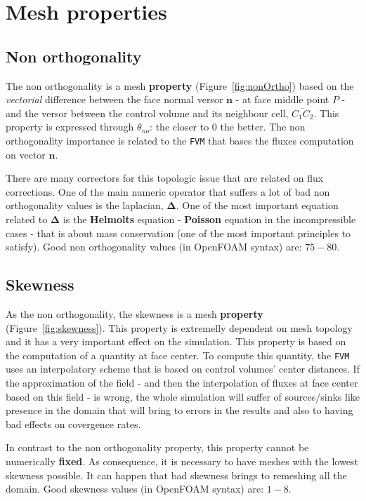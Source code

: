 \section{Mesh properties} \label{app:appMesh}

    \renewcommand{\thepage}{\arabic{page}}
    \setcounter{page}{\thelastPage}

\subsection{Non orthogonality} \label{sec:nonOrtho}
    The non orthogonality is a mesh \textbf{property} (Figure~\ref{fig:nonOrtho}) based on the \textit{vectorial} difference between the face normal versor $\boldsymbol{n}$ - at face middle point $P$ - and the versor between the control volume and its neighbour cell, $\overline{C_1 C_2}$. This property is expressed through $\theta_{no}$: the closer to $0$ the better. The non orthogonality importance is related to the \verb|FVM| that bases the fluxes computation on vector $\boldsymbol{n}$. 



There are many correctors for this topologic issue that are related on flux corrections. One of the main numeric operator that suffers a lot of bad non orthogonality values is the laplacian, $\boldsymbol{\Delta}$. One of the most important equation related to $\boldsymbol{\Delta}$ is the \textbf{Helmolts} equation - \textbf{Poisson} equation in the incompressible cases - that is about mass conservation (one of the most important principles to satisfy). Good non orthogonality values (in OpenFOAM syntax) are: $75 - 80$.

\subsection{Skewness} \label{sec:skewness}
As the non orthogonality, the skewness is a mesh \textbf{property} (Figure~\ref{fig:skewness}). This property is extremelly dependent on mesh topology and it has a very important effect on the simulation. This property is based on the computation of a quantity at face center. To compute this quantity, the \verb|FVM| uses an interpolatory scheme that is based on control volumes' center distances. If the approximation of the field - and then the interpolation of fluxes at face center based on this field - is wrong, the whole simulation will suffer of sources/sinks like presence in the domain that will bring to errors in the results and also to having bad effects on covergence rates. 
    


In contrast to the non orthogonality property, this property cannot be numerically \textbf{fixed}. As consequence, it is necessary to have meshes with the lowest skewness possible. It can happen that bad skewness brings to remeshing all the domain. Good skewness values (in OpenFOAM syntax) are: $1 - 8$. 
